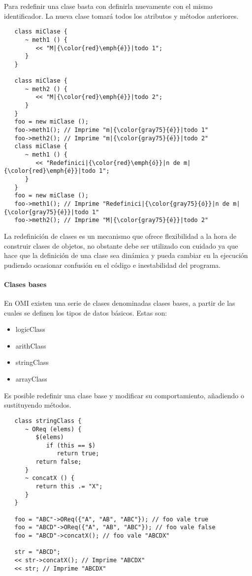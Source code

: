 Para redefinir una clase basta con definirla nuevamente con el mismo identificador. La nueva 
clase tomará todos los atributos y métodos anteriores. \\

\begin{lstlisting}
   class miClase {
      ~ meth1 () {
         << "M|{\color{red}\emph{é}}|todo 1";
      }
   }
   
   class miClase {
      ~ meth2 () {
         << "M|{\color{red}\emph{é}}|todo 2";
      }
   }
   foo = new miClase ();
   foo->meth1(); // Imprime "m|{\color{gray75}{é}}|todo 1"
   foo->meth2(); // Imprime "m|{\color{gray75}{é}}|todo 2"
   class miClase {
      ~ meth1 () {
         << "Redefinici|{\color{red}\emph{ó}}|n de m|{\color{red}\emph{é}}|todo 1";
      }
   }
   foo = new miClase ();
   foo->meth1(); // Imprime "Redefinici|{\color{gray75}{ó}}|n de m|{\color{gray75}{é}}|todo 1"
   foo->meth2(); // Imprime "M|{\color{gray75}{é}}|todo 2"
\end{lstlisting}

La redefinición de clases es un mecanismo que ofrece flexibilidad a la hora de construir clases de objetos, no obstante 
debe ser utilizado con cuidado ya que hace que la definición de una clase sea dinámica y pueda cambiar en la ejecución 
pudiendo ocasionar confusión en el código e inestabilidad del programa.

\paragraph{Clases bases}
En OMI existen una serie de clases denominadas clases bases, a partir de las 
cuales se definen los tipos de datos básicos. Estas son:

\begin{itemize}
\item logicClass
\item arithClass
\item stringClass
\item arrayClass
\end{itemize}

Es posible redefinir una clase base y modificar su comportamiento, añadiendo o sustituyendo 
métodos. \\

\begin{lstlisting}
   class stringClass {
      ~ OReq (elems) {
         $(elems)
            if (this == $) 
               return true;
         return false;
      }
      ~ concatX () {
         return this .= "X";
      }
   }

   foo = "ABC"->OReq({"A", "AB", "ABC"}); // foo vale true
   foo = "ABCD"->OReq({"A", "AB", "ABC"}); // foo vale false
   foo = "ABCD"->concatX(); // foo vale "ABCDX"
   
   str = "ABCD";
   << str->concatX(); // Imprime "ABCDX"
   << str; // Imprime "ABCDX"
\end{lstlisting}

